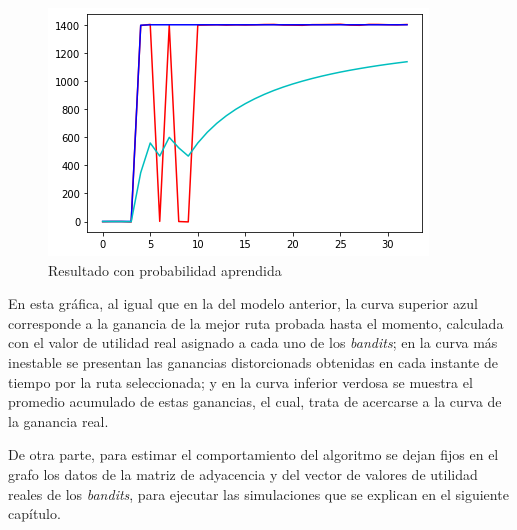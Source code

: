 \begin{figure} [H]
	\centering
	\includegraphics[scale=1]{Resul2}
	\caption{Resultado con probabilidad aprendida}
	\label{Resul2}
\end{figure}
En esta gráfica, al igual que en la del modelo anterior, la curva superior azul corresponde a la ganancia de la mejor ruta probada hasta el momento, calculada con el valor de utilidad real asignado a cada uno de los \textit{bandits}; en la curva más inestable se presentan las ganancias distorcionads obtenidas en cada instante de tiempo por la ruta seleccionada; y en la curva inferior verdosa se muestra el promedio acumulado de estas ganancias, el cual, trata de acercarse a la curva de la ganancia real. 

De otra parte, para estimar el comportamiento del algoritmo se dejan fijos en el grafo los datos de la matriz de adyacencia y del vector de valores de utilidad reales de los \textit{bandits}, para ejecutar las simulaciones que se explican en el siguiente capítulo.



